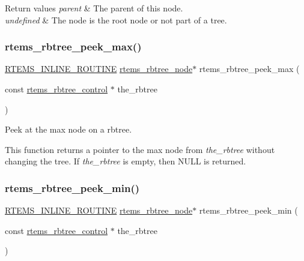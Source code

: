 \begin{DoxyRetVals}{Return values}
{\em parent} & The parent of this node. \\
\hline
{\em undefined} & The node is the root node or not part of a tree. \\
\hline
\end{DoxyRetVals}
\mbox{\label{group__ClassicRBTrees_gad222071d34caea276c4b61b05941735f}} 
\subsubsection{\texorpdfstring{rtems\_rbtree\_peek\_max()}{rtems\_rbtree\_peek\_max()}}
{\footnotesize\ttfamily \mbox{\hyperlink{group__RTEMSScoreBaseDefs_gac216239df231d5dbd15e3520b0b9313f}{R\+T\+E\+M\+S\+\_\+\+I\+N\+L\+I\+N\+E\+\_\+\+R\+O\+U\+T\+I\+NE}} \mbox{\hyperlink{group__ClassicRBTrees_gaef47fc7fc61856c9afbf7f18a26ff80d}{rtems\+\_\+rbtree\+\_\+node}}$\ast$ rtems\+\_\+rbtree\+\_\+peek\+\_\+max (\begin{DoxyParamCaption}\item[{const \mbox{\hyperlink{group__ClassicRBTrees_ga21fe446d0b3cb8b25c814e93357753ef}{rtems\+\_\+rbtree\+\_\+control}} $\ast$}]{the\+\_\+rbtree }\end{DoxyParamCaption})}



Peek at the max node on a rbtree. 

This function returns a pointer to the max node from {\itshape the\+\_\+rbtree} without changing the tree. If {\itshape the\+\_\+rbtree} is empty, then N\+U\+LL is returned. \mbox{\label{group__ClassicRBTrees_gaf8534bd70e35281fe993c5b6fd1a20b8}} 
\subsubsection{\texorpdfstring{rtems\_rbtree\_peek\_min()}{rtems\_rbtree\_peek\_min()}}
{\footnotesize\ttfamily \mbox{\hyperlink{group__RTEMSScoreBaseDefs_gac216239df231d5dbd15e3520b0b9313f}{R\+T\+E\+M\+S\+\_\+\+I\+N\+L\+I\+N\+E\+\_\+\+R\+O\+U\+T\+I\+NE}} \mbox{\hyperlink{group__ClassicRBTrees_gaef47fc7fc61856c9afbf7f18a26ff80d}{rtems\+\_\+rbtree\+\_\+node}}$\ast$ rtems\+\_\+rbtree\+\_\+peek\+\_\+min (\begin{DoxyParamCaption}\item[{const \mbox{\hyperlink{group__ClassicRBTrees_ga21fe446d0b3cb8b25c814e93357753ef}{rtems\+\_\+rbtree\+\_\+control}} $\ast$}]{the\+\_\+rbtree }\end{DoxyParamCaption})}



